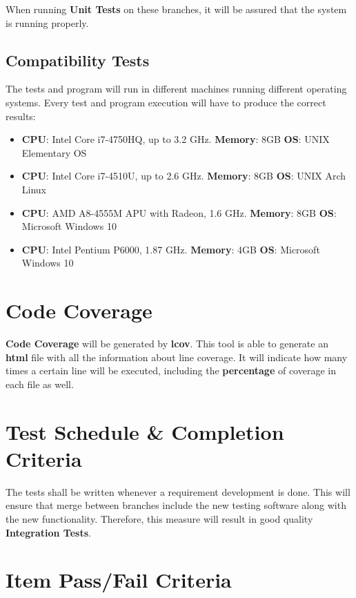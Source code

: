 \documentclass[12pt]{article}
\begin{document}
When running \textbf{Unit Tests} on these branches, it will be assured that the system is running properly. 

\subsection*{Compatibility Tests}

The tests and program will run in different machines running different operating systems. Every test and program execution will have to produce the correct results:

\begin{itemize}  
\item \textbf{CPU}: Intel Core i7-4750HQ, up to 3.2 GHz. \textbf{Memory}: 8GB \textbf{OS}: UNIX Elementary OS
\item \textbf{CPU}: Intel Core i7-4510U, up to 2.6 GHz. \textbf{Memory}: 8GB \textbf{OS}: UNIX Arch Linux
\item \textbf{CPU}: AMD A8-4555M APU with Radeon, 1.6 GHz. \textbf{Memory}: 8GB \textbf{OS}: Microsoft Windows 10
\item \textbf{CPU}: Intel Pentium P6000, 1.87 GHz. \textbf{Memory}: 4GB \textbf{OS}: Microsoft Windows 10
\end{itemize}

\section*{Code Coverage}

\textbf{Code Coverage} will be generated by \textbf{lcov}. This tool is able to generate an \textbf{html} file with all the information about line coverage. It will indicate how many times a certain line will be executed, including the \textbf{percentage} of coverage in each file as well.

\section*{Test Schedule \& Completion Criteria}

The tests shall be written whenever a requirement development is done. This will ensure that merge between branches include the new testing software along with the new functionality. Therefore, this measure will result in good quality \textbf{Integration Tests}.

\section*{Item Pass/Fail Criteria}
\end{document}
